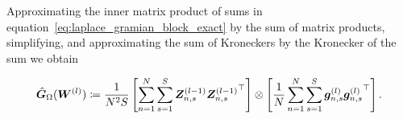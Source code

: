 %


Approximating the inner matrix product of sums in equation~\eqref{eq:laplace_gramian_block_exact} by the sum of matrix products, simplifying, and approximating the sum of Kroneckers by the Kronecker of the sum we obtain
\begin{tcolorbox}[colframe=kfac, title={KFAC for ENGD with the Laplace operator},bottom=0mm,top=0mm,middle=0mm]
\begin{align}\label{eq:KFAC-PINN}
    \hat{\mG}_\Omega%
    (\mW^{(l)})
    \coloneqq \frac{1}{N^2 S}
    \left[\sum_{n=1}^N \sum_{s=1}^S \mZ^{(l-1)}_{n,s}{\mZ^{(l-1)}_{n,s}}^\top \right]
    \otimes
  \left[
  \frac{1}{N}
  \sum_{n=1}^N\sum_{s=1}^S \vg^{(l)}_{n,s}{\vg^{(l)}_{n,s}}^\top
  \right].
\end{align}
\end{tcolorbox}







